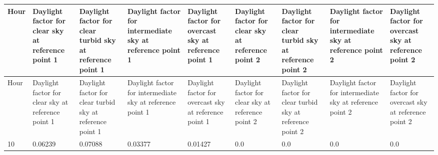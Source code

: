 {\scriptsize
\begin{longtable}[c]{>{\raggedright}p{0.5in}>{\raggedright}p{0.6in}>{\raggedright}p{0.6in}>{\raggedright}p{0.6in}>{\raggedright}p{0.6in}>{\raggedright}p{0.6in}>{\raggedright}p{0.6in}>{\raggedright}p{0.6in}>{\raggedright}p{0.6in}}
\toprule 
Hour & Daylight factor for clear sky at reference point 1 & Daylight factor for clear turbid sky at reference point 1 & Daylight factor for intermediate sky at reference point 1 & Daylight factor for overcast sky at reference point 1 & Daylight factor for clear sky at reference point 2 & Daylight factor for clear turbid sky at reference point 2 & Daylight factor for intermediate sky at reference point 2 & Daylight factor for overcast sky at reference point 2 \tabularnewline
\midrule
\endfirsthead

\toprule 
Hour & Daylight factor for clear sky at reference point 1 & Daylight factor for clear turbid sky at reference point 1 & Daylight factor for intermediate sky at reference point 1 & Daylight factor for overcast sky at reference point 1 & Daylight factor for clear sky at reference point 2 & Daylight factor for clear turbid sky at reference point 2 & Daylight factor for intermediate sky at reference point 2 & Daylight factor for overcast sky at reference point 2 \tabularnewline
\midrule
\endhead

10 & 0.06239 & 0.07088 & 0.03377 & 0.01427 & 0.0 & 0.0 & 0.0 & 0.0 \tabularnewline
\bottomrule
\end{longtable}}
